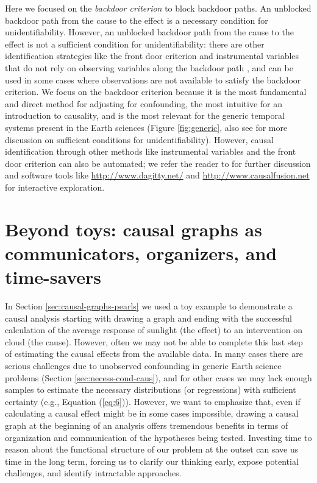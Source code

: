 \documentclass[12pt]{article}
\begin{document}
Here we focused on the \emph{backdoor criterion} to block backdoor
paths. An unblocked backdoor path from the cause to the effect is a
necessary condition for unidentifiability. However, an unblocked
backdoor path from the cause to the effect is not a sufficient
condition for unidentifiability: there are other identification
strategies like the front door criterion and instrumental variables
that do not rely on observing variables along the backdoor path
\citep{pearl2009causality}, and can be used in some cases where
observations are not available to satisfy the backdoor criterion. We
focus on the backdoor criterion because it is the most fundamental and
direct method for adjusting for confounding, the most intuitive for an
introduction to causality, and is the most relevant for the generic
temporal systems present in the Earth sciences (Figure
\ref{fig:generic}, also see \citet{tian2002general} for more discussion on
sufficient conditions for unidentifiability).  However, causal
identification through other methods like instrumental variables and
the front door criterion can also be automated; we refer the reader to
\citet{pearl2009causality} for further discussion and software tools
like \url{http://www.dagitty.net/} and
\url{http://www.causalfusion.net} for interactive exploration.


\section{Beyond toys: causal graphs as communicators, organizers, and
  time-savers}\label{sec:causal-graphs-as}

In Section \ref{sec:causal-graphs-pearls} we used a toy example to
demonstrate a causal analysis starting with drawing a graph and ending
with the successful calculation of the average response of sunlight
(the effect) to an intervention on cloud (the cause). However, often
we may not be able to complete this last step of estimating the causal
effects from the available data. In many cases there are serious
challenges due to unobserved confounding in generic Earth science
problems (Section \ref{sec:necess-cond-caus}), and for other cases we
may lack enough samples to estimate the necessary distributions (or
regressions) with sufficient certainty (e.g., Equation
(\ref{eq:6})). However, we want to emphasize that, even if calculating
a causal effect might be in some cases impossible, drawing a causal graph at the beginning of an analysis offers tremendous benefits in terms of
organization and communication of the hypotheses being tested. Investing time to reason about the
functional structure of our problem at the outset can save us time in
the long term, forcing us to clarify our thinking early, expose
potential challenges, and identify intractable approaches.
\end{document}
